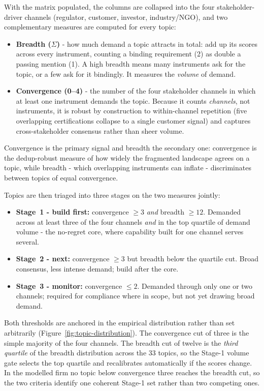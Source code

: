 With the matrix populated, the columns are collapsed into the four
stakeholder-driver channels (regulator, customer, investor, industry/NGO), and two
complementary measures are computed for every topic:
\begin{itemize}
\item \textbf{Breadth ($\Sigma$)} - how much demand a topic attracts in total: add
up its scores across every instrument, counting a binding requirement (2) as double a
passing mention (1). A high breadth means many instruments ask for the topic, or a
few ask for it bindingly. It measures the \emph{volume} of demand.
\item \textbf{Convergence (0--4)} - the number of the four stakeholder channels
in which at least one instrument demands the topic. Because it counts
\emph{channels}, not instruments, it is robust by construction to within-channel
repetition (five overlapping certifications collapse to a single customer signal)
and captures cross-stakeholder consensus rather than sheer volume.
\end{itemize}
Convergence is the primary signal and breadth the secondary one: convergence is
the dedup-robust measure of how widely the fragmented landscape agrees on a topic,
while breadth - which overlapping instruments can inflate - discriminates
between topics of equal convergence.

Topics are then triaged into three stages on the two measures jointly:
\begin{itemize}
\item \textbf{Stage~1 - build first:} convergence $\geq 3$ \emph{and} breadth
$\geq 12$. Demanded across at least three of the four channels \emph{and} in the
top quartile of demand volume - the no-regret core, where capability built for
one channel serves several.
\item \textbf{Stage~2 - next:} convergence $\geq 3$ but breadth below the
quartile cut. Broad consensus, less intense demand; build after the core.
\item \textbf{Stage~3 - monitor:} convergence $\leq 2$. Demanded through only one
or two channels; required for compliance where in scope, but not yet drawing broad
demand.
\end{itemize}
Both thresholds are anchored in the empirical distribution rather than set
arbitrarily (Figure~\ref{fig:topic-distribution}). The convergence cut of three is
the simple majority of the four channels. The breadth cut of twelve is the
\emph{third quartile} of the breadth distribution across the 33 topics, so the
Stage-1 volume gate selects the top quartile and recalibrates automatically if the
scores change. In the modelled firm no topic below convergence three reaches the
breadth cut, so the two criteria identify one coherent Stage-1 set rather than two
competing ones.

